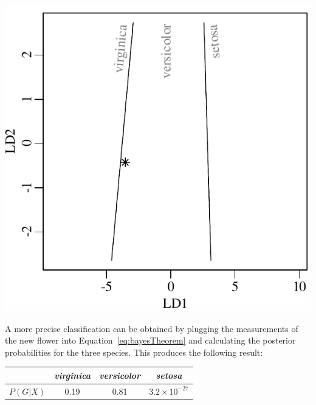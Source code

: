 \noindent\begin{minipage}[t][][b]{.35\textwidth}
\includegraphics[width=\textwidth]{../figures/LDAnewiris.pdf}\\
\end{minipage}
\begin{minipage}[t][][t]{.65\textwidth}
  \label{fig:LDAnewiris}
\end{minipage}

A more precise classification can be obtained by plugging the
measurements of the new flower into Equation~\ref{eq:bayesTheorem} and
calculating the posterior probabilities for the three species.  This
produces the following result:

\begin{center}
\begin{tabular}{cccc}
  & \emph{virginica} & \emph{versicolor} & \emph{setosa} \\ \hline
$P(G|X)$ & 0.19 & 0.81 & $3.2\times{10}^{-27}$
\end{tabular}
\end{center}


